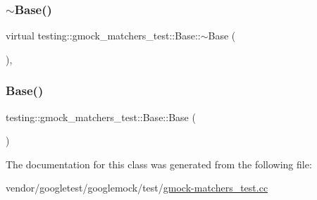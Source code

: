 \subsubsection{\texorpdfstring{$\sim$\+Base()}{~Base()}}
{\footnotesize\ttfamily virtual testing\+::gmock\+\_\+matchers\+\_\+test\+::\+Base\+::$\sim$\+Base (\begin{DoxyParamCaption}{ }\end{DoxyParamCaption})\hspace{0.3cm}{\ttfamily [inline]}, {\ttfamily [virtual]}}

\mbox{\label{classtesting_1_1gmock__matchers__test_1_1_base_ab3b2127992b81455804462897de44516}} 
\subsubsection{\texorpdfstring{Base()}{Base()}}
{\footnotesize\ttfamily testing\+::gmock\+\_\+matchers\+\_\+test\+::\+Base\+::\+Base (\begin{DoxyParamCaption}{ }\end{DoxyParamCaption})\hspace{0.3cm}{\ttfamily [inline]}}



The documentation for this class was generated from the following file\+:\begin{DoxyCompactItemize}
\item 
vendor/googletest/googlemock/test/\hyperlink{gmock-matchers__test_8cc}{gmock-\/matchers\+\_\+test.\+cc}\end{DoxyCompactItemize}
